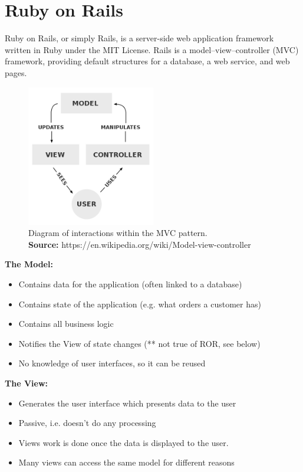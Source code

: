 \section{Ruby on Rails} 
\vspace{-5mm}
Ruby on Rails, or simply Rails, is a server-side web application framework written in Ruby under the MIT License. Rails is a model–view–controller (MVC) framework, providing default structures for a database, a web service, and web pages. \cite{wiki:RoR}

\begin{figure}[H]
	\centering
    \includegraphics[trim={0 0 0 0},clip,width=0.5\textwidth]{Files/MVC.png}
    \caption{Diagram of interactions within the MVC pattern.\\ \textbf{Source:} https://en.wikipedia.org/wiki/Model-view-controller}
    \label{fig: MVC}
\end{figure}




\textbf{The Model:}
\vspace{-5mm}
\begin{itemize}
 \setlength{\itemsep}{-5pt}
\item Contains data for the application (often linked to a database)
\item Contains state of the application (e.g. what orders a customer has)
\item  Contains all business logic
\item Notifies the View of state changes (** not true of ROR, see below)
\item No knowledge of user interfaces, so it can be reused
\end{itemize}

\textbf{The View:}
\vspace{-5mm}
\begin{itemize}
 \setlength{\itemsep}{-5pt}
\item Generates the user interface which presents data to the user
\item Passive, i.e. doesn’t do any processing
\item Views work is done once the data is displayed to the user.
\item Many views can access the same model for different reasons
\end{itemize}


